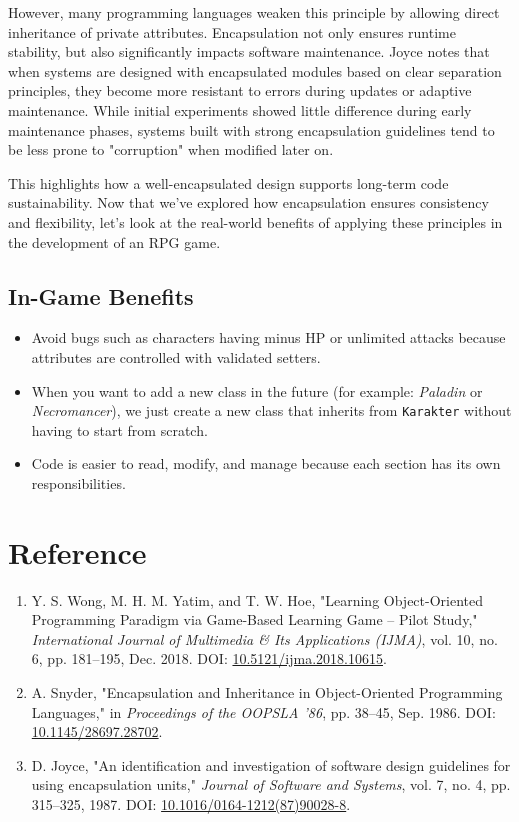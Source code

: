\documentclass[12pt]{article}
\begin{document}
However, many programming languages weaken this principle by allowing direct inheritance of private attributes. Encapsulation not only ensures runtime stability, but also significantly impacts software maintenance. Joyce notes that when systems are designed with encapsulated modules based on clear separation principles, they become more resistant to errors during updates or adaptive maintenance. While initial experiments showed little difference during early maintenance phases, systems built with strong encapsulation guidelines tend to be less prone to "corruption" when modified later on.

This highlights how a well-encapsulated design supports long-term code sustainability. Now that we’ve explored how encapsulation ensures consistency and flexibility, let’s look at the real-world benefits of applying these principles in the development of an RPG game.




\subsection*{In-Game Benefits}
\begin{itemize}
    \item Avoid bugs such as characters having minus HP or unlimited attacks because attributes are controlled with validated setters.
    \item When you want to add a new class in the future (for example: \textit{Paladin} or \textit{Necromancer}), we just create a new class that inherits from  \texttt{Karakter} without having to start from scratch.
    \item Code is easier to read, modify, and manage because each section has its own responsibilities.
\end{itemize}

\section{Reference}

\begin{enumerate}
    \item Y. S. Wong, M. H. M. Yatim, and T. W. Hoe, "Learning Object-Oriented Programming Paradigm via Game-Based Learning Game – Pilot Study," \textit{International Journal of Multimedia \& Its Applications (IJMA)}, vol. 10, no. 6, pp. 181–195, Dec. 2018. DOI: \href{https://doi.org/10.5121/ijma.2018.10615}{10.5121/ijma.2018.10615}.
    
    \item A. Snyder, "Encapsulation and Inheritance in Object-Oriented Programming Languages," in \textit{Proceedings of the OOPSLA '86}, pp. 38–45, Sep. 1986. DOI: \href{https://doi.org/10.1145/28697.28702}{10.1145/28697.28702}.
    
    \item D. Joyce, "An identification and investigation of software design guidelines for using encapsulation units," \textit{Journal of Software and Systems}, vol. 7, no. 4, pp. 315–325, 1987. DOI: \href{https://doi.org/10.1016/0164-1212(87)90028-8}{10.1016/0164-1212(87)90028-8}.
\end{enumerate}

\printbibliography
\end{document}

